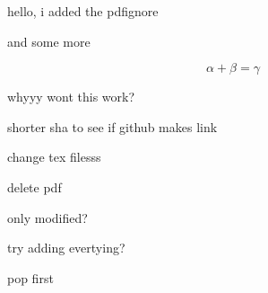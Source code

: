 \documentclass{article}
\begin{document}
hello, i added the pdfignore

and some more

$$\alpha + \beta = \gamma$$


whyyy wont this work?

shorter sha to see if github makes link

change tex filesss

delete pdf

only modified?

try adding evertying?

pop first
\end{document}
